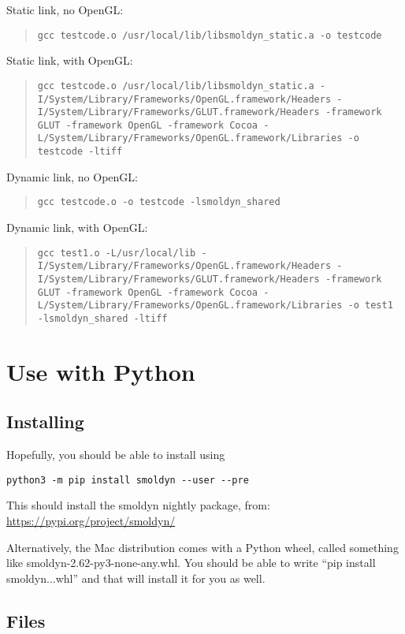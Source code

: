 \documentclass {book}
\begin{document}
Static link, no OpenGL:
\begin{quote}
\lstinline{gcc testcode.o /usr/local/lib/libsmoldyn_static.a -o testcode}
\end{quote}

Static link, with OpenGL:
\begin{quote}
\lstinline{gcc testcode.o /usr/local/lib/libsmoldyn_static.a -I/System/Library/Frameworks/OpenGL.framework/Headers -I/System/Library/Frameworks/GLUT.framework/Headers -framework GLUT -framework OpenGL -framework Cocoa -L/System/Library/Frameworks/OpenGL.framework/Libraries -o testcode -ltiff}
\end{quote}

Dynamic link, no OpenGL:
\begin{quote}
\lstinline{gcc testcode.o -o testcode -lsmoldyn_shared}
\end{quote}

Dynamic link, with OpenGL:
\begin{quote}
\lstinline{gcc test1.o -L/usr/local/lib -I/System/Library/Frameworks/OpenGL.framework/Headers -I/System/Library/Frameworks/GLUT.framework/Headers -framework GLUT -framework OpenGL -framework Cocoa -L/System/Library/Frameworks/OpenGL.framework/Libraries -o test1 -lsmoldyn_shared -ltiff}
\end{quote}


\chapter{Use with Python}

\section{Installing}

Hopefully, you should be able to install using
\begin{verbatim}
python3 -m pip install smoldyn --user --pre
\end{verbatim}
This should install the smoldyn nightly package, from: \url{https://pypi.org/project/smoldyn/}

Alternatively, the Mac distribution comes with a Python wheel, called something like smoldyn-2.62-py3-none-any.whl. You should be able to write ``pip install smoldyn...whl'' and that will install it for you as well.

\section{Files}
\end{document}
